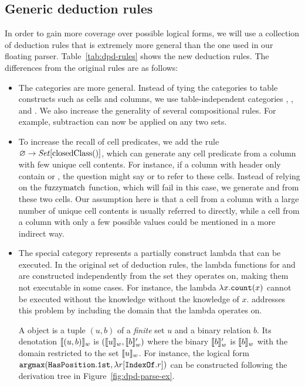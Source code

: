 

\subsection{Generic deduction rules}
In order to gain more coverage over possible logical forms,
we will use a collection of deduction rules
that is extremely more general than the one used in our floating parser.
Table~\ref{tab:dpd-rules}
shows the new deduction rules.
The differences from the original rules are as follows:

\begin{itemize}
\item
The categories are more general.
Instead of tying the categories to table constructs
such as cells and columns,
we use table-independent categories , , and .
We also increase the generality of several
compositional rules.
For example, subtraction can now be applied on any two sets.

\item
To increase the recall of cell predicates,
we add the rule
$\varnothing \to \text{\emph{Set}}[\mathrm{closedClass}()]$,
which can generate any cell predicate
from a column with few unique cell contents.
For instance, if a column with header 
only contain  or ,
the question might say 
or  to refer to these cells.
Instead of relying on the $\mathrm{fuzzymatch}$ function,
which will fail in this case,
we generate  and  from these two cells.
Our assumption here is that a cell from a column with a large number
of unique cell contents is usually referred to directly,
while a cell from a column with only a few possible values
could be mentioned in a more indirect way.

\item
The special  category represents a partially
construct lambda that can be executed.
In the original set of deduction rules,
the lambda functions for  and 
are constructed independently from the set
they operates on, making them not executable in some cases.
For instance, the lambda $\lambda x.\texttt{count}(x)$
cannot be executed without the knowledge
without the knowledge of $x$.
 addresses this problem by including
the domain that the lambda operates on.

A  object is a tuple $(u, b)$
of a \emph{finite} set $u$ and a binary relation $b$.
Its denotation $\llbracket{(u, b)}\rrbracket_{w}$ is
$(\llbracket{u}\rrbracket_{w}, \llbracket{b}\rrbracket_{w}')$
where the binary $\llbracket{b}\rrbracket_{w}'$ is $\llbracket{b}\rrbracket_{w}$
with the domain restricted to the set $\llbracket{u}\rrbracket_{w}$.
For instance,
the logical form $\texttt{argmax}(\texttt{Has}{\texttt{Position}}.\texttt{1st}, \lambda r[{\texttt{Index}}\texttt{Of}.r])$ can be constructed
following the derivation tree in Figure~\ref{fig:dpd-parse-ex}.
\end{itemize}

